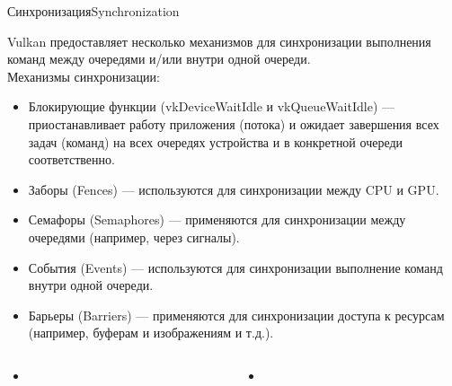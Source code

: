 \documentclass{beamer}
\begin{document}
	\begin{frame}{Синхронизация}{Synchronization}

		Vulkan предоставляет несколько механизмов для синхронизации выполнения команд между очередями и/или внутри одной очереди. \\
		Механизмы синхронизации:
		\begin{itemize}
			\item
			Блокирующие функции (vkDeviceWaitIdle и vkQueueWaitIdle) --- приостанавливает работу приложения (потока) и ожидает завершения всех задач (команд) на всех очередях устройства и в конкретной очереди соответственно.
			\item
			Заборы (Fences) --- используются для синхронизации между CPU и GPU.
			\item 
			Семафоры (Semaphores) --- применяются для синхронизации между очередями (например, через сигналы).
			\item
			События (Events) --- используются для синхронизации выполнение команд внутри одной очереди.
			\item
			Барьеры (Barriers) --- применяются для синхронизации доступа к ресурсам (например, буферам и изображениям и т.д.).
		\end{itemize}


	\end{frame}

\begin{columns}
	
	\begin{column}{0.5\textwidth}
		\begin{itemize}
			\item
			
		\end{itemize}
	\end{column}
	\begin{column}{0.5\textwidth}
		\begin{itemize}
			\item
		\end{itemize}
	\end{column}
	
\end{columns}
\fi
	
\end{document}
